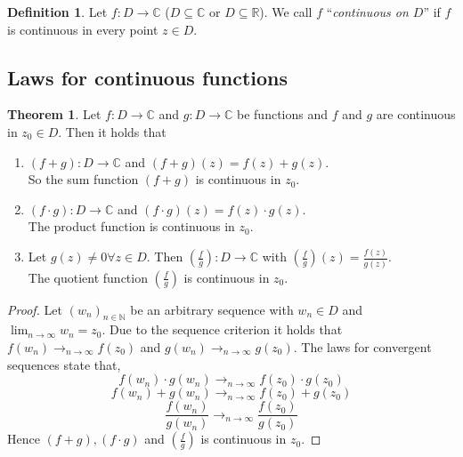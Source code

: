 \documentclass[a4paper,landscape,twocolumn]{article}
\theoremstyle{definition}
\newtheorem{theorem}{Theorem}
\newtheorem{defi}{Definition}
\newcommand\seq[1]{{\left(#1\right)}_{n \in \mathbb N}}
\begin{document}
\begin{defi}
  Let $f: D \to \mathbb C$ ($D \subseteq \mathbb C$ or $D \subseteq \mathbb R$).
  We call $f$ \enquote{\emph{continuous on $D$}} if $f$ is continuous in every point $z \in D$.
\end{defi}

\subsection{Laws for continuous functions}
%
\begin{theorem}
  Let $f: D \to \mathbb C$ and $g: D \to \mathbb C$ be functions
  and $f$ and $g$ are continuous in $z_0 \in D$. Then it holds that
  \begin{enumerate}
    \item $(f + g): D \to \mathbb C$ and $(f + g)(z) = f(z) + g(z)$. \\
      So the sum function $(f + g)$ is continuous in $z_0$.
    \item $(f \cdot g): D \to \mathbb C$ and $(f \cdot g)(z) = f(z) \cdot g(z)$. \\
      The product function is continuous in $z_0$.
    \item Let $g(z) \neq 0 \forall z \in D$. Then $\left(\frac{f}{g}\right): D \to \mathbb C$
      with $\left(\frac fg\right)(z) = \frac{f(z)}{g(z)}$. \\
      The quotient function $\left(\frac fg\right)$ is continuous in $z_0$.
  \end{enumerate}
\end{theorem}
\begin{proof}
  Let $\seq{w_n}$ be an arbitrary sequence with $w_n \in D$
  and $\lim_{n\to\infty} w_n = z_0$. Due to the sequence criterion
  it holds that $f(w_n) \to_{n\to\infty} f(z_0)$ and $g(w_n) \to_{n\to\infty} g(z_0)$.
  The laws for convergent sequences state that,
  \[ f(w_n) \cdot g(w_n) \to_{n\to\infty} f(z_0) \cdot g(z_0) \]
  \[ f(w_n) + g(w_n) \to_{n\to\infty} f(z_0) + g(z_0) \]
  \[ \frac{f(w_n)}{g(w_n)} \to_{n\to\infty} \frac{f(z_0)}{g(z_0)} \]
  Hence $(f + g), (f \cdot g)$ and $\left(\frac fg\right)$ is continuous in $z_0$.
\end{proof}
\end{document}
